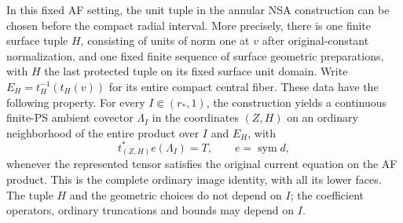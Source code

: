 \begin{proposition}
\label{prop:r13-surface-preparation-before-interval}
In this fixed AF setting, the unit tuple in the annular
NSA construction can be chosen before the compact radial
interval.  More precisely, there is one finite surface
tuple \(H\), consisting of units of norm one at \(v\)
after original-constant normalization, and one fixed
finite sequence of surface geometric preparations, with
\(H\) the last protected tuple on its fixed surface
unit domain.  Write \(E_H=t_H^{-1}(t_H(v))\) for its
entire compact central fiber.  These data have
the following property.  For every
\(I\Subset(r_*,1)\), the construction yields a continuous
finite-PS ambient covector \(\Lambda_I\) in the coordinates
\((Z,H)\) on an ordinary neighborhood of the entire
product over \(I\) and \(E_H\), with
\[
                    t_{(Z,H)}^*e(\Lambda_I)=T,
                       \qquad e=\operatorname{sym}d,
\tag{UA3}
\]
whenever the represented tensor satisfies the original
current equation on the AF product.  This is the complete
ordinary image identity, with all its lower faces.  The
tuple \(H\) and the geometric choices do not depend on
\(I\); the coefficient operators, ordinary truncations
and bounds may depend on \(I\).
\end{proposition}

